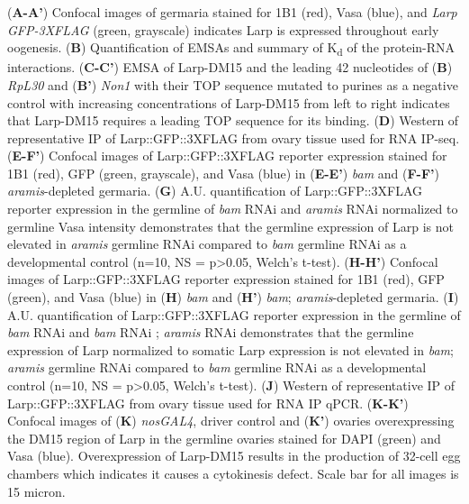 \documentclass[12pt,oneside]{reedthesis}
\begin{document}
\setlength\parindent{0pt}(\textbf{A-A'}) Confocal images of germaria stained for 1B1 (red), Vasa (blue), and \emph{Larp GFP-3XFLAG} (green, grayscale) indicates Larp is expressed throughout early oogenesis. (\textbf{B}) Quantification of EMSAs and summary of K\textsubscript{d} of the protein-RNA interactions. (\textbf{C-C'}) EMSA of Larp-DM15 and the leading 42 nucleotides of (\textbf{B}) \emph{RpL30} and (\textbf{B'}) \emph{Non1} with their TOP sequence mutated to purines as a negative control with increasing concentrations of Larp-DM15 from left to right indicates that Larp-DM15 requires a leading TOP sequence for its binding. (\textbf{D}) Western of representative IP of Larp::GFP::3XFLAG from ovary tissue used for RNA IP-seq. (\textbf{E-F'}) Confocal images of Larp::GFP::3XFLAG reporter expression stained for 1B1 (red), GFP (green, grayscale), and Vasa (blue) in (\textbf{E-E'}) \emph{bam} and (\textbf{F-F'}) \emph{aramis}-depleted germaria. (\textbf{G}) A.U. quantification of Larp::GFP::3XFLAG reporter expression in the germline of \emph{bam} RNAi and \emph{aramis} RNAi normalized to germline Vasa intensity demonstrates that the germline expression of Larp is not elevated in \emph{aramis} germline RNAi compared to \emph{bam} germline RNAi as a developmental control (n=10, NS = p\textgreater0.05, Welch's t-test). (\textbf{H-H'}) Confocal images of Larp::GFP::3XFLAG reporter expression stained for 1B1 (red), GFP (green), and Vasa (blue) in (\textbf{H}) \emph{bam} and (\textbf{H'}) \emph{bam}; \emph{aramis}-depleted germaria. (\textbf{I}) A.U. quantification of Larp::GFP::3XFLAG reporter expression in the germline of \emph{bam} RNAi and \emph{bam} RNAi ; \emph{aramis} RNAi demonstrates that the germline expression of Larp normalized to somatic Larp expression is not elevated in \emph{bam}; \emph{aramis} germline RNAi compared to \emph{bam} germline RNAi as a developmental control (n=10, NS = p\textgreater0.05, Welch's t-test). (\textbf{J}) Western of representative IP of Larp::GFP::3XFLAG from ovary tissue used for RNA IP qPCR. (\textbf{K-K'}) Confocal images of (\textbf{K}) \emph{nosGAL4}, driver control and (\textbf{K'}) ovaries overexpressing the DM15 region of Larp in the germline ovaries stained for DAPI (green) and Vasa (blue). Overexpression of Larp-DM15 results in the production of 32-cell egg chambers which indicates it causes a cytokinesis defect. Scale bar for all images is 15 micron.


\textbf{\hfill\break
}
\end{document}
